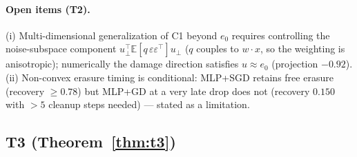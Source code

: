 \documentclass{article}
\begin{document}
\paragraph{Open items (T2).} (i) Multi-dimensional generalization of C1 beyond $e_0$ requires
controlling the noise-subspace component $u_\perp^\top\mathbb{E}[q\,\varepsilon\varepsilon^\top]u_\perp$
($q$ couples to $w\cdot x$, so the weighting is anisotropic); numerically the damage direction
satisfies $u\approx e_0$ (projection $-0.92$). (ii) Non-convex erasure timing is
conditional: MLP+SGD retains free erasure (recovery $\ge0.78$) but MLP+GD at a very late drop
does not (recovery $0.150$ with $>5$ cleanup steps needed) --- stated as a limitation.

\subsection{T3 (Theorem~\ref{thm:t3})}
\end{document}

